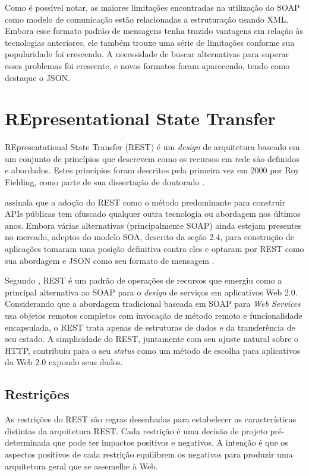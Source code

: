 Como é possível notar, as maiores limitações encontradas na utilização do SOAP como modelo de comunicação estão relacionadas a estruturação usando XML. Embora esse formato padrão de mensagens tenha trazido vantagens em relação às tecnologias anteriores, ele também trouxe uma série de limitações conforme sua popularidade foi crescendo. A necessidade de buscar alternativas para superar esses problemas foi crescente, e novos formatos foram aparecendo, tendo como destaque o JSON.

\section{REpresentational State Transfer}\label{sec:rest}

REpresentational State Transfer (REST) é um \textit{design} de arquitetura baseado em um conjunto de princípios que descrevem como os recursos em rede são definidos e abordados. Estes princípios foram descritos pela primeira vez em 2000 por Roy Fielding, como parte de sua dissertação de doutorado \cite{rest-intro}.

 assinala que a adoção do REST como o método predominante para construir APIs públicas tem ofuscado qualquer outra tecnologia ou abordagem nos últimos anos. Embora várias alternativas (principalmente SOAP) ainda estejam presentes no mercado, adeptos do modelo SOA, descrito da seção 2.4,  para construção de aplicações tomaram uma posição definitiva contra eles e optaram por REST como sua abordagem e JSON como seu formato de mensagem .

Segundo , REST é um padrão de operações de recursos que emergiu como a principal alternativa ao SOAP para o \textit{design} de serviços em aplicativos Web 2.0. Considerando que a abordagem tradicional baseada em SOAP para \textit{Web Services} usa objetos remotos completos com invocação de método remoto e funcionalidade encapsulada, o REST trata apenas de estruturas de dados e da transferência de seu estado. A simplicidade do REST, juntamente com seu ajuste natural sobre o HTTP, contribuiu para o seu \textit{status} como um método de escolha para aplicativos da Web 2.0 expondo seus dados.

\subsection{Restrições}

As restrições do REST são regras desenhadas para estabelecer as características distintas da arquitetura REST. Cada restrição é uma decisão de projeto pré-determinada que pode ter impactos positivos e negativos. A intenção é que os aspectos positivos de cada restrição equilibrem os negativos para produzir uma arquitetura geral que se assemelhe à Web.

